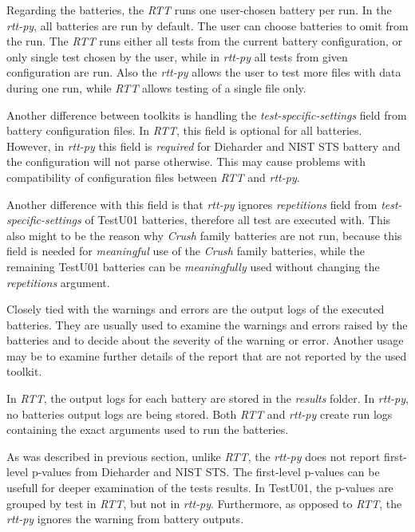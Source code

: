 \documentclass[
  digital,     %
  oneside,     %
  nosansbold,  %
  nocolorbold, %
  nolof,         %
  nolot,         %
]{fithesis4}
\begin{document}
Regarding the batteries, the \emph{RTT} runs one user-chosen battery per run. In the \emph{rtt-py}, all batteries are run by default. The user can choose batteries to omit from the run. The \emph{RTT} runs either all tests from the current battery configuration, or only single test chosen by the user, while in \emph{rtt-py} all tests from given configuration are run. Also the \emph{rtt-py} allows the user to test more files with data during one run, while \emph{RTT} allows testing of a single file only.

Another difference between toolkits is handling the \emph{test-specific-settings} field from battery configuration files. In \emph{RTT}, this field is optional for all batteries. However, in \emph{rtt-py} this field is \emph{required} for Dieharder and NIST STS battery and the configuration will not parse otherwise. This may cause problems with compatibility of configuration files between \emph{RTT} and \emph{rtt-py}.

Another difference with this field is that \emph{rtt-py} ignores \emph{repetitions} field from \emph{test-specific-settings} of TestU01 batteries, therefore all test are executed with. This also might to be the reason why \emph{Crush} family batteries are not run, because this field is needed for \emph{meaningful} use of the \emph{Crush} family batteries, while the remaining TestU01 batteries can be \emph{meaningfully} used without changing the \emph{repetitions} argument.



Closely tied with the warnings and errors are the output logs of the executed batteries. They are usually used to examine the warnings and errors raised by the batteries and to decide about the severity of the warning or error. Another usage may be to examine further details of the report that are not reported by the used toolkit. 

In \emph{RTT}, the output logs for each battery are stored in the \emph{results} folder. In \emph{rtt-py}, no batteries output logs are being stored. Both \emph{RTT} and \emph{rtt-py} create run logs containing the exact arguments used to run the batteries.

As was described in previous section, unlike \emph{RTT}, the \emph{rtt-py} does not report first-level p-values from Dieharder and NIST STS. The first-level p-values can be usefull for deeper examination of the tests results. In TestU01, the p-values are grouped by test in \emph{RTT}, but not in \emph{rtt-py}. Furthermore, as opposed to \emph{RTT}, the \emph{rtt-py} ignores the warning from battery outputs.
\end{document}
